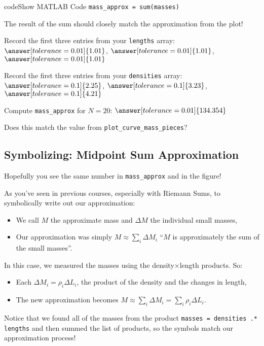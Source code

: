 \documentclass{ximera}
\begin{document}
\begin{expandable}{code}{Show MATLAB Code}
\texttt{mass\_approx = sum(masses)}
\end{expandable}

The result of the sum should closely match the approximation from the plot!

\begin{problem}
Record the first three entries from your \texttt{lengths} array: $\answer[tolerance=0.01]{1.01}$, $\answer[tolerance=0.01]{1.01}$, $\answer[tolerance=0.01]{1.01}$

Record the first three entries from your \texttt{densities} array: $\answer[tolerance=0.1]{2.25}$, $\answer[tolerance=0.1]{3.23}$, $\answer[tolerance=0.1]{4.21}$

Compute \texttt{mass\_approx} for $N=20$: $\answer[tolerance=0.01]{134.354}$

Does this match the value from \texttt{plot\_curve\_mass\_pieces}? 
\end{problem}

\subsection*{Symbolizing: Midpoint Sum Approximation}

Hopefully you see the same number in \texttt{mass\_approx} and in the figure!

As you've seen in previous courses, especially with Riemann Sums, to symbolically write out our approximation:
\begin{itemize}
\item We call $M$ the approximate mass and $\Delta M$ the individual small masses,
\item Our approximation was simply $M \approx \sum_i \Delta M_i$ ``$M$ is approximately the sum of the small masses''.
\end{itemize}

In this case, we measured the masses using the density$\times$length products. So:
\begin{itemize}
\item Each $\Delta M_i = \rho_i \Delta L_i$, the product of the density and the changes in length,
\item The new approximation becomes $M \approx \sum_i \Delta M_i = \sum_i \rho_i \Delta L_i$.
\end{itemize}

Notice that we found all of the masses from the product \texttt{masses = densities .* lengths} and then summed the list of products, so the symbols match our approximation process!
\end{document}
